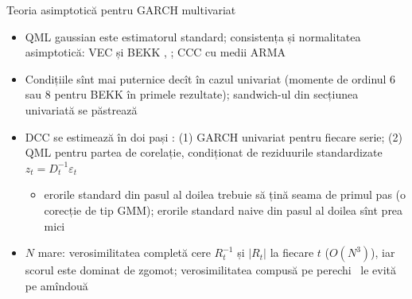 \begin{frame}{Teoria asimptotică pentru GARCH multivariat}
\itemsize{\small}
\begin{itemize}
    \item QML gaussian este estimatorul standard; consistența și normalitatea asimptotică: VEC și BEKK , ; CCC cu medii ARMA 
    \item Condițiile sînt mai puternice decît în cazul univariat (momente de ordinul 6 sau 8 pentru BEKK în primele rezultate); sandwich-ul din secțiunea univariată se păstrează
    \item DCC se estimează în doi pași : (1) GARCH univariat pentru fiecare serie; (2) QML pentru partea de corelație, condiționat de reziduurile standardizate $z_t = D_t^{-1}\varepsilon_t$
    \begin{itemize}
        \item erorile standard din pasul al doilea trebuie să țină seama de primul pas (o corecție de tip GMM); erorile standard naive din pasul al doilea sînt prea mici
    \end{itemize}
    \item $N$ mare: verosimilitatea completă cere $R_t^{-1}$ și $|R_t|$ la fiecare $t$ ($O(N^3)$), iar scorul este dominat de zgomot; verosimilitatea compusă pe perechi \ le evită pe amîndouă
\end{itemize}
\end{frame}

